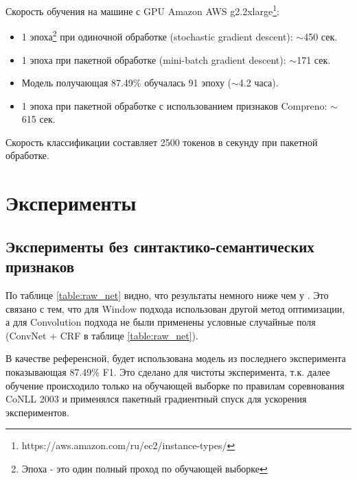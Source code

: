 Скорость обучения на машине с GPU Amazon AWS g2.2xlarge\footnote{https://aws.amazon.com/ru/ec2/instance-types/}:
\begin{itemize}
\item 1 эпоха\footnote{Эпоха - это один полный проход по обучающей выборке} при одиночной обработке (stochastic gradient descent): $\sim$450 сек.
\item 1 эпоха при пакетной обработке (mini-batch gradient descent): $\sim$171 сек.
\item Модель получающая 87.49\% обучалась 91 эпоху ($\sim$4.2 часа).
\item 1 эпоха при пакетной обработке с использованием признаков Compreno: $\sim$615 сек.
\end{itemize}

Скорость классификации составляет 2500 токенов в секунду при пакетной обработке.

\newpage

\section{Эксперименты}

\subsection{Эксперименты без синтактико-семантических признаков}
По таблице \ref{table:raw_net} видно, что результаты немного ниже чем у \citep{collobert2011natural}.
Это связано с тем, что для Window подхода использован другой метод оптимизации,
а для Convolution подхода не были применены условные случайные поля (ConvNet + CRF в таблице \ref{table:raw_net}).

В качестве референсной, будет использована модель из последнего эксперимента
показывающая 87.49\% F1.
Это сделано для чистоты эксперимента, т.к. далее  обучение происходило только
на обучающей выборке по правилам соревнования CoNLL 2003 и применялся пакетный
градиентный спуск для ускорения экспериментов.

\newpage

